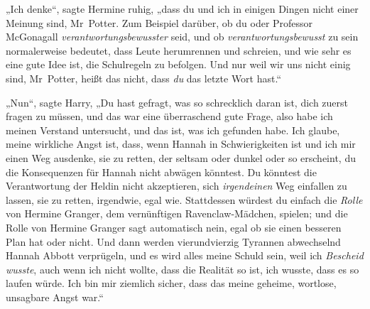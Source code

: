 „Ich denke“, sagte Hermine ruhig, „dass du und ich in einigen Dingen nicht einer Meinung sind, Mr~Potter. Zum Beispiel darüber, ob du oder Professor McGonagall \emph{verantwortungsbewusster} seid, und ob \emph{verantwortungsbewusst} zu sein normalerweise bedeutet, dass Leute herumrennen und schreien, und wie sehr es eine gute Idee ist, die Schulregeln zu befolgen. Und nur weil wir uns nicht einig sind, Mr~Potter, heißt das nicht, dass \emph{du} das letzte Wort hast.“

„Nun“, sagte Harry,
„Du hast gefragt, was so schrecklich daran ist, dich zuerst fragen zu müssen, und das war eine überraschend gute Frage, also habe ich meinen Verstand untersucht, und das ist, was ich gefunden habe. Ich glaube, meine wirkliche Angst ist, dass, wenn Hannah in Schwierigkeiten ist und ich mir einen Weg ausdenke, sie zu retten, der seltsam oder dunkel oder so erscheint, du die Konsequenzen für Hannah nicht abwägen könntest. Du könntest die Verantwortung der Heldin nicht akzeptieren, sich \emph{irgendeinen} Weg einfallen zu lassen, sie zu retten, irgendwie, egal wie. Stattdessen würdest du einfach die \emph{Rolle} von Hermine Granger, dem vernünftigen Ravenclaw-Mädchen, spielen; und die Rolle von Hermine Granger sagt automatisch nein, egal ob sie einen besseren Plan hat oder nicht. Und dann werden vierundvierzig Tyrannen abwechselnd Hannah Abbott verprügeln, und es wird alles meine Schuld sein, weil ich \emph{Bescheid wusste}, auch wenn ich nicht wollte, dass die Realität so ist, ich wusste, dass es so laufen würde. Ich bin mir ziemlich sicher, dass das meine geheime, wortlose, unsagbare Angst war.“

